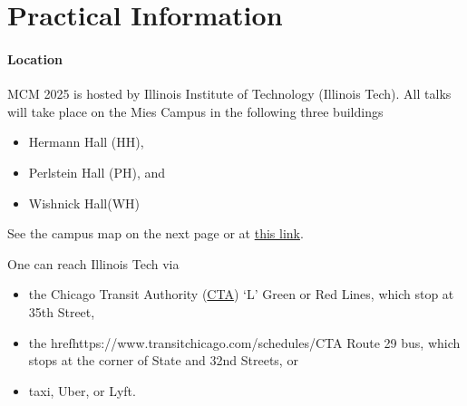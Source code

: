 


\chapter{Practical Information}



\subsubsection{Location}
MCM 2025 is hosted by Illinois Institute of Technology (Illinois Tech).  All talks will take place on the Mies Campus in the following three buildings
\begin{itemize}
	\item Hermann Hall (HH),
	\item Perlstein Hall (PH), and
	\item Wishnick Hall(WH)
\end{itemize}
See the campus map on the next page or at \href{https://www.iit.edu/sites/default/files/2022-08/mies-campus-accessibility-map-2022.pdf}{this link}.  


One can reach Illinois Tech via 
\begin{itemize}
	\item the Chicago Transit Authority (\href{https://www.transitchicago.com/schedules/}{CTA}) `L' Green or Red Lines, which stop at 35th Street, 
	\item the href{https://www.transitchicago.com/schedules/}{CTA} Route 29 bus, which stops at the corner of State and 32nd Streets, or
	\item taxi, Uber, or Lyft.
\end{itemize}



\newpage

